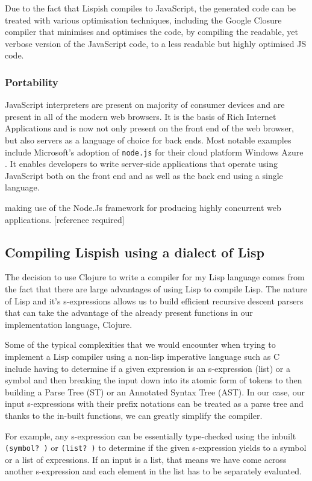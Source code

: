 Due to the fact that Lispish compiles to JavaScript, the generated code can be treated with various optimisation techniques, including the Google Closure compiler that minimises and optimises the code, by compiling the readable, yet verbose version of the JavaScript code, to a less readable but highly optimised JS code.

\subsubsection{Portability}
JavaScript interpreters are present on majority of consumer devices and are present in all of the modern web browsers. It is the basis of Rich Internet Applications and is now not only present on the front end of the web browser, but also servers as a language of choice for back ends.
Most notable examples include Microsoft's adoption of \texttt{node.js} for their cloud platform Windows Azure \cite{nodejs.WindowsAzure}. It enables developers to write server-side applications that operate using JavaScript both on the front end and as well as the back end using a single language.

 making use of the Node.Js framework for producing highly concurrent web applications. [reference required]

\subsection{Compiling Lispish using a dialect of Lisp}
The decision to use Clojure to write a compiler for my Lisp language comes from the fact that there are large advantages of using Lisp to compile Lisp.
The nature of Lisp and it's s-expressions allows us to build efficient recursive descent parsers that can take the advantage of the already present functions in our implementation language, Clojure.

Some of the typical complexities that we would encounter when trying to implement a Lisp compiler using a non-lisp imperative language such as C include having to determine if a given expression is an s-expression (list) or a symbol and then breaking the input down into its atomic form of tokens to then building a Parse Tree (ST) or an Annotated Syntax Tree (AST).
In our case, our input s-expressions with their prefix notations can be treated as a parse tree and thanks to the in-built functions, we can greatly simplify the compiler.

For example, any s-expression can be essentially type-checked using the inbuilt \texttt{(symbol? )} or \texttt{(list? )} to determine if the given s-expression yields to a symbol or a list of expressions. If an input is a list, that means we have come across another s-expression and each element in the list has to be separately evaluated.

